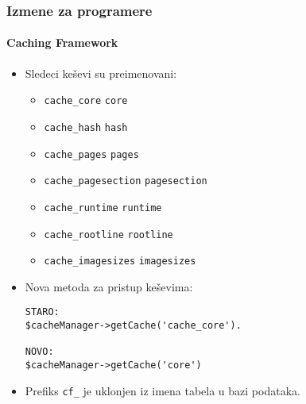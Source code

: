 
\begin{frame}[fragile]
	\frametitle{Izmene za programere}
	\framesubtitle{Caching Framework}

	\lstset{basicstyle=\tiny\ttfamily}

	\begin{itemize}
		\item Sledeci keševi su preimenovani:

			\begin{itemize}\smaller
				\item \texttt{cache\_core} \textrightarrow\hspace{0.1cm}\texttt{core}
				\item \texttt{cache\_hash} \textrightarrow\hspace{0.1cm}\texttt{hash}
				\item \texttt{cache\_pages} \textrightarrow\hspace{0.1cm}\texttt{pages}
				\item \texttt{cache\_pagesection} \textrightarrow\hspace{0.1cm}\texttt{pagesection}
				\item \texttt{cache\_runtime} \textrightarrow\hspace{0.1cm}\texttt{runtime}
				\item \texttt{cache\_rootline} \textrightarrow\hspace{0.1cm}\texttt{rootline}
				\item \texttt{cache\_imagesizes} \textrightarrow\hspace{0.1cm}\texttt{imagesizes}
			\end{itemize}\normalsize

		\item Nova metoda za pristup keševima:

\begin{lstlisting}
STARO:
$cacheManager->getCache('cache_core').

NOVO:
$cacheManager->getCache('core')
\end{lstlisting}

		\item Prefiks \texttt{cf\_} je uklonjen iz imena tabela u bazi podataka.
	\end{itemize}

\end{frame}

